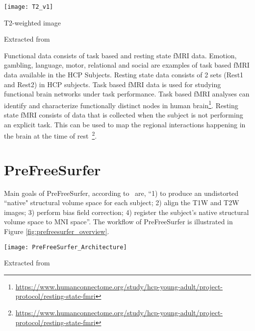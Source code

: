 \begin{center}
  \texttt{[image: T2\_v1]}
  \caption{T2-weighted image}
  \label{fig:T2w}
  \caption*{Extracted from \cite{t1w_t2w}}
\end{center}

\indent Functional data consists of task based and resting state fMRI data. Emotion, gambling, language, motor, relational and social are examples of task based fMRI data available in the HCP Subjects. Resting state data consists of 2 sets (Rest1 and Rest2) in HCP subjects. Task based fMRI data is used for studying functional brain networks under task performance. Task based fMRI analyses can identify and characterize functionally distinct nodes in human brain\footnote{\url{https://www.humanconnectome.org/study/hcp-young-adult/project-protocol/resting-state-fmri}}. Resting state fMRI consists of data that is collected when the subject is not performing an explicit task. This can be used to map the regional interactions happening in the brain at the time of rest~\footnote{\url{https://www.humanconnectome.org/study/hcp-young-adult/project-protocol/resting-state-fmri}}.

\section{PreFreeSurfer} \label{sec:PrefreeSurfer}
Main goals of PreFreeSurfer, according to~\cite{Gla13} are, ``1) to produce an undistorted ``native" structural volume space for each subject; 2) align the T1W and T2W images; 3) perform bias field correction; 4) register the subject's native structural volume space to MNI space''. The workflow of PreFreeSurfer is illustrated in Figure \ref{fig:prefreesurfer_overview}.

\begin{center}
  \texttt{[image: PreFreeSurfer\_Architecture]}
  \label{fig:prefreesurfer_overview}
  \caption*{Extracted from \cite{Gla13}}
\end{center}


